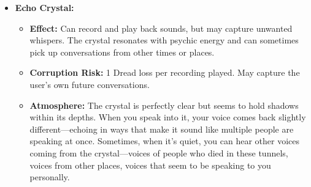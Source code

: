 \documentclass[11pt]{article}
\begin{document}
\begin{itemize}
\begin{itemize}
  \item \textbf{Corruption Risk:} 1 Dread loss per use from hearing the enemy's perspective. May point toward allies under stress.
  \item \textbf{Atmosphere:} The compass is carved from what appears to be human bone, polished to a mirror shine. The needle is a sliver of dark metal that seems to drink in light. When you hold it, you can feel a faint vibration, like the distant echo of a heartbeat. The needle spins wildly at first, then settles with a slight tremor, always pointing toward something you'd rather not meet.
  \end{itemize}
\item \textbf{Echo Crystal:} 
  \begin{itemize}
  \item \textbf{Effect:} Can record and play back sounds, but may capture unwanted whispers. The crystal resonates with psychic energy and can sometimes pick up conversations from other times or places.
  \item \textbf{Corruption Risk:} 1 Dread loss per recording played. May capture the user's own future conversations.
  \item \textbf{Atmosphere:} The crystal is perfectly clear but seems to hold shadows within its depths. When you speak into it, your voice comes back slightly different---echoing in ways that make it sound like multiple people are speaking at once. Sometimes, when it's quiet, you can hear other voices coming from the crystal---voices of people who died in these tunnels, voices from other places, voices that seem to be speaking to you personally.
  \end{itemize}
\end{itemize}
\end{document}
